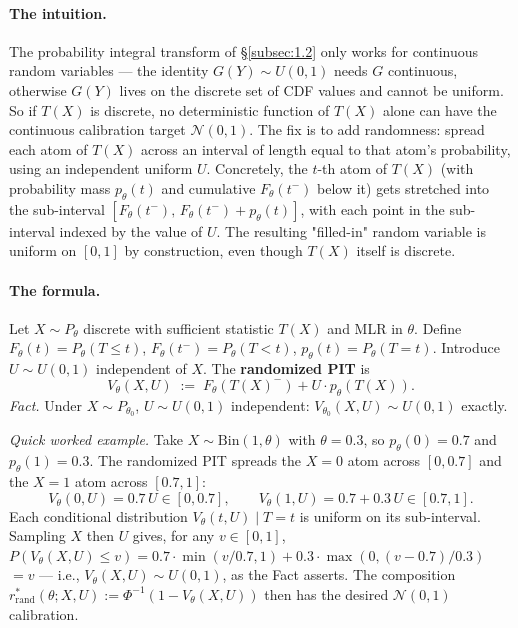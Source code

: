 \documentclass[11pt]{article}
\begin{document}
\paragraph{The intuition.}
The probability integral transform of \S\ref{subsec:1.2} only works for
continuous random variables --- the identity \(G(Y) \sim U(0, 1)\) needs
\(G\) continuous, otherwise \(G(Y)\) lives on the discrete set of CDF
values and cannot be uniform. So if \(T(X)\) is discrete, no
deterministic function of \(T(X)\) alone can have the continuous
calibration target \(\mathcal{N}(0, 1)\). The fix is to add randomness:
spread each atom of \(T(X)\) across an interval of length equal to that
atom's probability, using an independent uniform \(U\). Concretely, the
\(t\)-th atom of \(T(X)\) (with probability mass \(p_\theta(t)\) and
cumulative \(F_\theta(t^-)\) below it) gets stretched into the
sub-interval \([F_\theta(t^-),\, F_\theta(t^-) + p_\theta(t)]\), with
each point in the sub-interval indexed by the value of \(U\). The
resulting "filled-in" random variable is uniform on \([0, 1]\) by
construction, even though \(T(X)\) itself is discrete.

\paragraph{The formula.}
Let \(X \sim P_\theta\) discrete with sufficient statistic \(T(X)\) and
MLR in \(\theta\). Define \(F_\theta(t) = P_\theta(T \leq t)\),
\(F_\theta(t^-) = P_\theta(T < t)\), \(p_\theta(t) = P_\theta(T = t)\).
Introduce \(U \sim U(0,1)\) independent of \(X\). The \textbf{randomized
PIT} is \[
V_\theta(X, U) \;:=\; F_\theta(T(X)^-) + U \cdot p_\theta(T(X)).
\] \emph{Fact.} Under \(X \sim P_{\theta_0}\), \(U \sim U(0,1)\)
independent: \(V_{\theta_0}(X, U) \sim U(0,1)\) exactly.

\emph{Quick worked example.} Take \(X \sim \mathrm{Bin}(1, \theta)\)
with \(\theta = 0.3\), so \(p_\theta(0) = 0.7\) and \(p_\theta(1) = 0.3\).
The randomized PIT spreads the \(X = 0\) atom across \([0, 0.7]\) and
the \(X = 1\) atom across \([0.7, 1]\):
\[
V_\theta(0, U) = 0.7\,U \in [0, 0.7],
\qquad
V_\theta(1, U) = 0.7 + 0.3\,U \in [0.7, 1].
\]
Each conditional distribution \(V_\theta(t, U) \mid T = t\) is uniform
on its sub-interval. Sampling \(X\) then \(U\) gives, for any \(v \in [0, 1]\),
\(P(V_\theta(X, U) \le v) = 0.7 \cdot \min(v / 0.7, 1) + 0.3 \cdot \max(0, (v - 0.7)/0.3)\)
\(= v\) --- i.e.,
\(V_\theta(X, U) \sim U(0, 1)\), as the Fact asserts. The composition
\(r^*_\mathrm{rand}(\theta; X, U) := \Phi^{-1}(1 - V_\theta(X, U))\)
then has the desired \(\mathcal{N}(0, 1)\) calibration.
\end{document}
